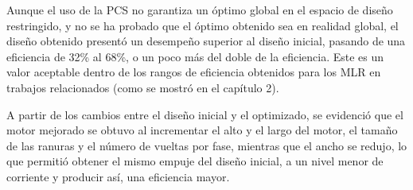 Aunque el uso de la PCS no garantiza un óptimo global en el espacio de diseño restringido, y no se ha probado que el óptimo obtenido sea en realidad global, el diseño obtenido presentó un desempeño superior al diseño inicial, pasando de una eficiencia de 32\% al 68\%, o un poco más del doble de la eficiencia. Este es un valor aceptable dentro de los rangos de eficiencia obtenidos para los MLR en trabajos relacionados (como se mostró en el capítulo 2).

A partir de los cambios entre el diseño inicial y el optimizado, se evidenció que el motor mejorado se obtuvo al incrementar el alto y el largo del motor, el tamaño de las ranuras y el número de vueltas por fase, mientras que el ancho se redujo, lo que permitió obtener el mismo empuje del diseño inicial, a un nivel menor de corriente y producir así, una eficiencia mayor.


